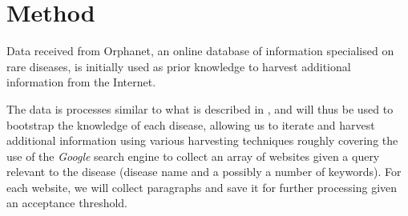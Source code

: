 \documentclass[10pt,letterpaper,final]{article}
\begin{document}










\section{Method}
\label{chap:method}
Data received from Orphanet, an online database of information
specialised on rare diseases, is initially used as prior knowledge to
harvest additional information from the Internet.





The data is processes similar to what is described in
\cite{jensenandersen}, and will thus be used to bootstrap the knowledge
of each disease, allowing us to iterate and harvest additional
information using various harvesting techniques roughly covering the use
of the \textit{Google} search engine to collect an array of websites
given a query relevant to the disease (disease name and a possibly a
number of keywords). For each website, we will collect paragraphs and
save it for further processing given an acceptance threshold.
\end{document}
